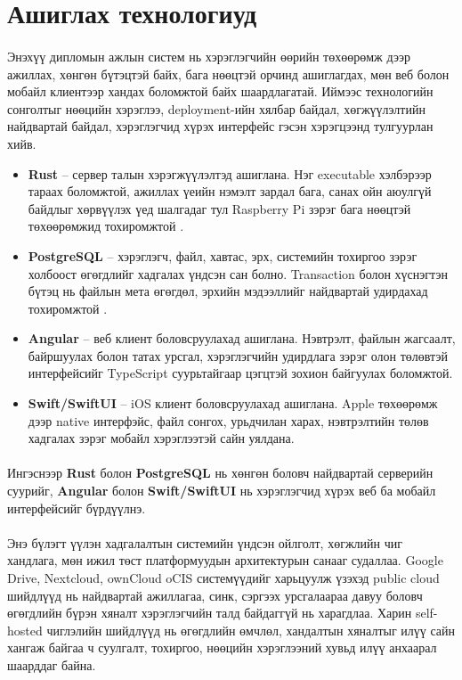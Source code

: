 \section{Ашиглах технологиуд}

\paragraph{}
Энэхүү дипломын ажлын систем нь хэрэглэгчийн өөрийн төхөөрөмж дээр ажиллах, хөнгөн бүтэцтэй байх, бага нөөцтэй орчинд ашиглагдах, мөн веб болон мобайл клиентээр хандах боломжтой байх шаардлагатай. Иймээс технологийн сонголтыг нөөцийн хэрэглээ, deployment-ийн хялбар байдал, хөгжүүлэлтийн найдвартай байдал, хэрэглэгчид хүрэх интерфейс гэсэн хэрэгцээнд тулгуурлан хийв.

\begin{itemize}
    \item \textbf{Rust} -- сервер талын хэрэгжүүлэлтэд ашиглана. Нэг executable хэлбэрээр тараах боломжтой, ажиллах үеийн нэмэлт зардал бага, санах ойн аюулгүй байдлыг хөрвүүлэх үед шалгадаг тул Raspberry Pi зэрэг бага нөөцтэй төхөөрөмжид тохиромжтой \cite{rust-book}.
    \item \textbf{PostgreSQL} -- хэрэглэгч, файл, хавтас, эрх, системийн тохиргоо зэрэг холбоост өгөгдлийг хадгалах үндсэн сан болно. Transaction болон хүснэгтэн бүтэц нь файлын мета өгөгдөл, эрхийн мэдээллийг найдвартай удирдахад тохиромжтой \cite{postgresql-about}.
    \item \textbf{Angular} -- веб клиент боловсруулахад ашиглана. Нэвтрэлт, файлын жагсаалт, байршуулах болон татах урсгал, хэрэглэгчийн удирдлага зэрэг олон төлөвтэй интерфейсийг TypeScript суурьтайгаар цэгцтэй зохион байгуулах боломжтой.
    \item \textbf{Swift/SwiftUI} -- iOS клиент боловсруулахад ашиглана. Apple төхөөрөмж дээр native интерфэйс, файл сонгох, урьдчилан харах, нэвтрэлтийн төлөв хадгалах зэрэг мобайл хэрэглээтэй сайн уялдана.
\end{itemize}

\paragraph{}
Ингэснээр \textbf{Rust} болон \textbf{PostgreSQL} нь хөнгөн боловч найдвартай серверийн суурийг, \textbf{Angular} болон \textbf{Swift/SwiftUI} нь хэрэглэгчид хүрэх веб ба мобайл интерфейсийг бүрдүүлнэ.

\paragraph{}
Энэ бүлэгт үүлэн хадгалалтын системийн үндсэн ойлголт, хөгжлийн чиг хандлага, мөн ижил төст платформуудын архитектурын санааг судаллаа. Google Drive, Nextcloud, ownCloud oCIS системүүдийг харьцуулж үзэхэд public cloud шийдлүүд нь найдвартай ажиллагаа, синк, сэргээх урсгалаараа давуу боловч өгөгдлийн бүрэн хяналт хэрэглэгчийн талд байдаггүй нь харагдлаа. Харин self-hosted чиглэлийн шийдлүүд нь өгөгдлийн өмчлөл, хандалтын хяналтыг илүү сайн хангаж байгаа ч суулгалт, тохиргоо, нөөцийн хэрэглээний хувьд илүү анхаарал шаарддаг байна.


